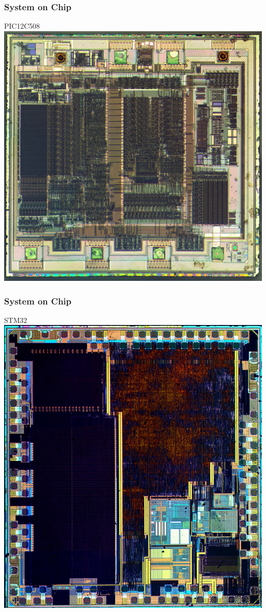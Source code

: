 \documentclass[fleqn]{beamer} %
\newcommand{\sectiontitleIII}{System on Chip}
\begin{document}
	\begin{frame}[label=sectionIII] \small
\frametitle{\sectiontitleIII}

		PIC12C508\\
		\includegraphics[scale=.15]{pic12c508_die_hd.png}



\end{frame}

	\begin{frame}[label=sectionIII] \small
\frametitle{\sectiontitleIII}


STM32 \\
\includegraphics[scale=.15]{stm32_die.png}


\end{frame}
\end{document}
